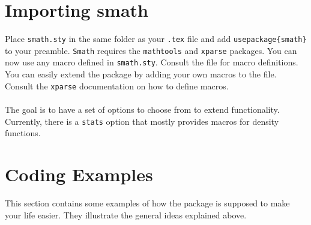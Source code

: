 \documentclass[a4paper,10pt]{scrartcl}
\begin{document}
\section{Importing smath}
Place \texttt{smath.sty} in the same folder as your \texttt{.tex} file and add \texttt{usepackage\{smath\}} to your preamble. \texttt{Smath} requires the \texttt{mathtools} and \texttt{xparse} packages. You can now use any macro defined in \texttt{smath.sty}. Consult the file for macro definitions. You can easily extend the package by adding your own macros to the file. Consult the \texttt{xparse} documentation on how to define macros.\\\\
The goal is to have a set of options to choose from to extend functionality. Currently, there is a \texttt{stats} option that mostly provides macros for density functions.

\section{Coding Examples}
This section contains some examples of how the package is supposed to make your life easier. They illustrate the general ideas explained above.
\end{document}
